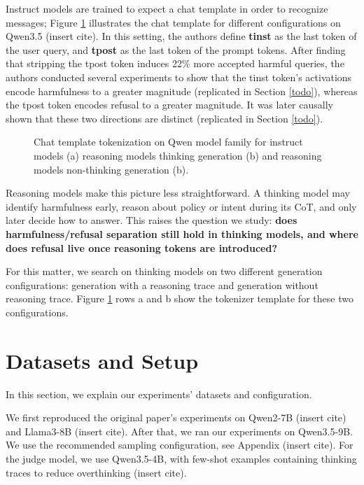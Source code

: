 \documentclass[nohyperref]{article}
\theoremstyle{plain}
\theoremstyle{definition}
\theoremstyle{remark}
\begin{document}
Instruct models are trained to expect a chat template in order to recognize messages; Figure \ref{fig:tokens} illustrates the chat template for different configurations on Qwen3.5 (insert cite). In this setting, the authors define \textbf{tinst} as the last token of the user query, and \textbf{tpost} as the last token of the prompt tokens. After finding that stripping the tpost token induces 22\% more accepted harmful queries, the authors conducted several experiments to show that the tinst token's activations encode harmfulness to a greater magnitude (replicated in Section \ref{todo}), whereas the tpost token encodes refusal to a greater magnitude. It was later causally shown that these two directions are distinct (replicated in Section \ref{todo}).

\begin{figure}[h]
\centering
\resizebox{\textwidth}{!}{%

}
\caption{Chat template tokenization on Qwen model family for instruct models (a) reasoning models thinking generation (b) and reasoning models non-thinking generation (b).}
\label{fig:tokens}
\end{figure}

Reasoning models make this picture less straightforward. A thinking model may identify harmfulness early, reason about policy or intent during its CoT, and only later decide how to answer. This raises the question we study: \textbf{does harmfulness/refusal separation still hold in thinking models, and where does refusal live once reasoning tokens are introduced?} 

For this matter, we search on thinking models on two different generation configurations: generation with a reasoning trace and generation without reasoning trace. Figure \ref{fig:tokens} rows a and b show the tokenizer template for these two configurations.


\section{Datasets and Setup}
\label{sec:datasets}

In this section, we explain our experiments' datasets and configuration.

We first reproduced the original paper's experiments on Qwen2-7B (insert cite) and Llama3-8B (insert cite). After that, we ran our experiments on Qwen3.5-9B. We use the recommended sampling configuration, see Appendix (insert cite). For the judge model, we use Qwen3.5-4B, with few-shot examples containing thinking traces to reduce overthinking (insert cite).
\end{document}
